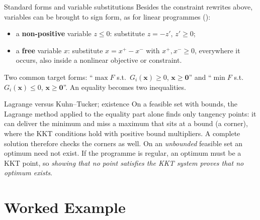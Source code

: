 \begin{rulebox}{Standard forms and variable substitutions}
Besides the constraint rewrites above, variables can be brought to sign
form, as for linear programmes ():
\begin{itemize}[leftmargin=1.6em,itemsep=0.3ex]
  \item a \textbf{non-positive} variable $z\le0$: substitute $z=-z'$,
        $z'\ge0$;
  \item a \textbf{free} variable $x$: substitute $x=x^{+}-x^{-}$ with
        $x^{+},x^{-}\ge0$, everywhere it occurs, also inside a nonlinear
        objective or constraint.
\end{itemize}
Two common target forms: ``$\max F$ s.t.\ $G_i(\mathbf{x})\ge0$,
$\mathbf{x}\ge\mathbf{0}$'' and ``$\min F$ s.t.\ $G_i(\mathbf{x})\le0$,
$\mathbf{x}\ge\mathbf{0}$''. An equality becomes two inequalities.
\end{rulebox}

\begin{rulebox}{Lagrange versus Kuhn--Tucker; existence}
On a feasible set with bounds, the Lagrange method applied to the equality
part alone finds only tangency points: it can deliver the minimum and miss
a maximum that sits at a bound (a corner), where the KKT conditions hold
with positive bound multipliers. A complete solution therefore checks the
corners as well. On an \emph{unbounded} feasible set an optimum need not
exist. If the programme is regular, an optimum must be a KKT point, so
\emph{showing that no point satisfies the KKT system proves that no optimum
exists}.
\end{rulebox}

\section{Worked Example}

